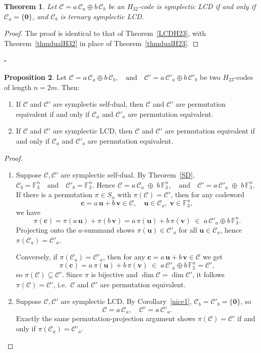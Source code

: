 \documentclass[11pt,a4paper]{article}
\def\qed{\hfill {$\square$}\goodbreak \medskip}
\newtheorem{theorem}{Theorem}[section]
\theoremstyle{definition}
\newtheorem{proposition}[theorem]{Proposition}
\numberwithin{equation}{section}
\def\u{{\mathbf u}}
\def\v{{\mathbf v}}
\def\c{{\mathbf c}}
\newcommand{\F}{\mathbb{F}}
\def\C{{\mathcal{C}}}
\begin{document}
\begin{theorem}
Let $\C=a\, \C_a \oplus b\, \C_b$ be an $H_{32}$-code is symplectic LCD if and only if $\C_a=\{\mathbf{0}\}$, and $\C_b $ is ternary symplectic LCD.
\end{theorem}

\begin{proof}
The proof is identical to that of Theorem~\ref{LCDH23}, with Theorem~\ref{thmdualH32} in place of Theorem~\ref{thmdualH23}.
\end{proof}
\qed

\begin{proposition}\label{permLCDH23}
Let $\C = a\,\C_a\oplus b\,\C_b, \quad\text{and}\quad
\C' = a\,\C'_a\oplus b\,\C'_b$ be two $H_{23}$-codes of length $n=2m$.  Then:
\begin{enumerate}
  \item If $\C$ and $\C'$ are symplectic self-dual, then $\C$ and $\C'$ are permutation equivalent if and only if $\C_a$ and $\C'_a$ are permutation equivalent.
  \item If $\C$ and $\C'$ are symplectic LCD, then $\C$ and $\C'$ are permutation equivalent if and only if $\C_a$ and $\C'_a$ are permutation equivalent.
\end{enumerate}
\end{proposition}

\begin{proof}
\begin{enumerate}
\item[1.]  Suppose $\C,\C'$ are symplectic self-dual.  By Theorem~\ref{SD}, $\C_b=\F_3^n
\quad\text{and}\quad
\C'_b=\F_3^n.$ Hence $\C = a\,\C_a\;\oplus\;b\,\F_3^n,
\quad\text{and}\quad
\C' = a\,\C'_a\;\oplus\;b\,\F_3^n.$ If there is a permutation $\pi\in S_n$ with $\pi(\C)=\C'$, then for any codeword
\[
\c=a\,\u+b\,\v\in\C,\quad \u\in\C_a,\;\v\in\F_3^n,
\]
we have 
\[
\pi(\c)
=\pi(a\,\u)+\pi(b\,\v)
=a\,\pi(\u)+b\,\pi(\v)
\;\in\;
a\,\C'_a\oplus b\,\F_3^n.
\]
Projecting onto the $a$-summand shows $\pi(\u)\in\C'_a$ for all $\u\in\C_a$, hence $\pi(\C_a)=\C'_a$.

Conversely, if $\pi(\C_a)=\C'_a$, then for any 
$\c=a\,\u+b\,\v\in\C$ we get
\[
\pi(\c)
= a\,\pi(\u) + b\,\pi(\v)
\;\in\;
a\,\C'_a\oplus b\,\F_3^n
=\C',
\]
so $\pi(\C)\subseteq\C'$.  Since $\pi$ is bijective and $\dim\C=\dim\C'$, it follows $\pi(\C)=\C'$, i.e.\ $\C$ and $\C'$ are permutation equivalent.

\item[2.]  Suppose $\C,\C'$ are symplectic LCD.  By Corollary~\ref{nice1}, $\C_b=\C'_b=\{\mathbf0\}$, so 
\[
\C = a\,\C_a,
\quad
\C' = a\,\C'_a.
\]
Exactly the same permutation-projection argument shows $\pi(\C)=\C'$ if and only if $\pi(\C_a)=\C'_a$.
\end{enumerate}
\end{proof}
\end{document}
